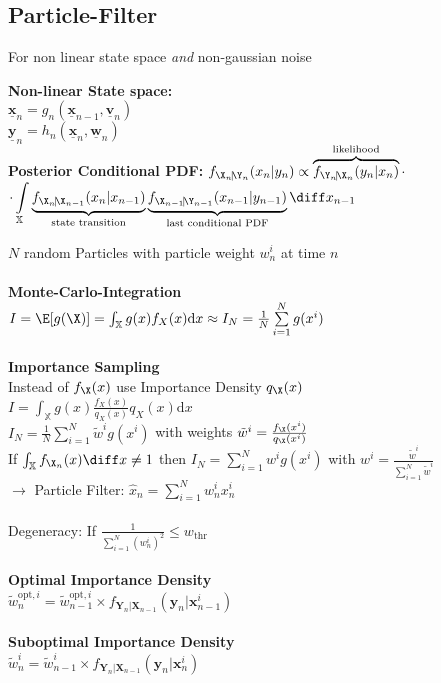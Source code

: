 \documentclass[english]{latex4ei/latex4ei_sheet}
\renewcommand{\vec}[1]{\underline{\boldsymbol{#1}}}
\begin{document}
\begin{sectionbox}
	\subsection{Particle-Filter}
	For non linear state space \emph{and} non-gaussian noise

	\textbf{Non-linear State space:}\\
	$\vec x_n = g_n(\vec x_{n−1}, \vec v_n)$\\
	$\vec y_n = h_n(\vec x_{n}, \vec w_n)$\\


	\textbf{Posterior Conditional PDF:} $f_{\X_n\!|\!\Y_n}(x_n|y_n) \propto \overbrace{ f_{\Y_n\!|\!\X_n}(y_n|x_n) }^{\text{likelihood}} \cdot$\\
	${ \displaystyle \cdot \int\limits_{\mathbb X} \underbrace{ f_{\X_n\!|\!\X_{n-1}}(x_n|x_{n-1}) }_{\text{state transition}} \underbrace{ f_{\X_{n-1}\!|\!\Y_{n-1}}(x_{n-1}|y_{n-1}) }_{\text{last conditional PDF}} \diff x_{n-1} }$


	$N$ random Particles with particle weight $w_n^i$ at time $n$\\
	\\
	\textbf{Monte-Carlo-Integration}\\
	$I = \E[g(\X)] = \int_{\mathbb{X}} g(x) f_{X}(x) \mathrm{d} x \approx I_N = \frac{1}{N} \sum\limits_{i=1}^{N} g(x^i)$\\
	\\
	\textbf{Importance Sampling}\\
	Instead of $f_{\X}(x)$ use Importance Density $q_{\X}(x)$\\
	$I = \int_{\mathbb{X}} g(x) \frac{f_{X}(x)}{q_X (x)} q_X (x) \mathrm{d} x$\\
	$I_N = \frac{1}{N} \sum\limits_{i=1}^{N} \tilde w^i g(x^i)$ with weights $\tilde w^i = \frac{f_{\X}(x^i)}{q_{\X}(x^i)}$\\
	If $\int_{\mathbb{X}} f_{\X_n}(x) \diff x \ne 1$ then $I_N = \sum\limits_{i=1}^{N} w^i g(x^i)$ with $w^i = \frac{\tilde w^i}{\sum\limits_{i=1}^{N} \tilde w^i}$\\
	$\rightarrow$ Particle Filter: $\hat x_n = \sum_{i=1}^{N} w_n^i x_n^i$\\
	\\
	Degeneracy: If $\frac{1}{\sum_{i=1}^{N}\left(w_{n}^{i}\right)^{2}} \leq w_{\text {thr }}$\\
	\\
	\textbf{Optimal Importance Density}\\
	$\tilde{w}_{n}^{\mathrm{opt}, i}=\tilde{w}_{n-1}^{\mathrm{opt}, i} \times f_{\boldsymbol{Y}_{n} | \boldsymbol{X}_{n-1}}\left(\boldsymbol{y}_{n} | \boldsymbol{x}_{n-1}^{i}\right)$\\
	\\
	\textbf{Suboptimal Importance Density}\\
	$\tilde{w}_{n}^{i}=\tilde{w}_{n-1}^{i} \times f_{\boldsymbol{Y}_{n} | \boldsymbol{X}_{n-1}}\left(\boldsymbol{y}_{n} | \boldsymbol{x}_{n}^{i}\right)$\\
\end{sectionbox}
\end{document}
